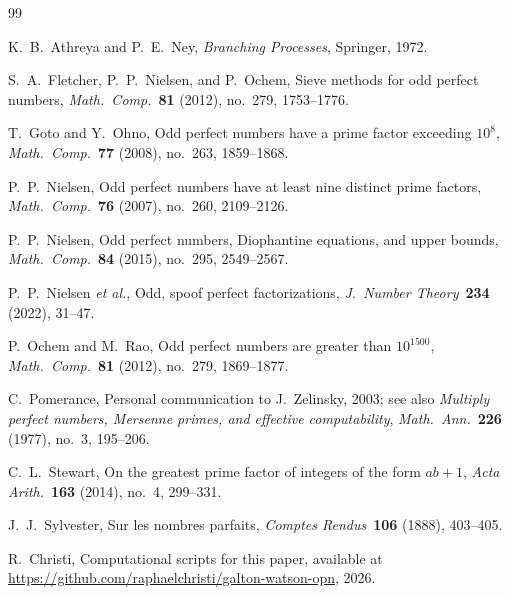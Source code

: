 \documentclass[11pt]{article}
\theoremstyle{definition}
\theoremstyle{remark}
\begin{document}
\begin{thebibliography}{99}

K.~B.~Athreya and P.~E.~Ney,
\emph{Branching Processes},
Springer, 1972.

S.~A.~Fletcher, P.~P.~Nielsen, and P.~Ochem,
Sieve methods for odd perfect numbers,
\emph{Math.\ Comp.}\ \textbf{81} (2012), no.~279, 1753--1776.

T.~Goto and Y.~Ohno,
Odd perfect numbers have a prime factor exceeding $10^8$,
\emph{Math.\ Comp.}\ \textbf{77} (2008), no.~263, 1859--1868.

P.~P.~Nielsen,
Odd perfect numbers have at least nine distinct prime factors,
\emph{Math.\ Comp.}\ \textbf{76} (2007), no.~260, 2109--2126.

P.~P.~Nielsen,
Odd perfect numbers, Diophantine equations, and upper bounds,
\emph{Math.\ Comp.}\ \textbf{84} (2015), no.~295, 2549--2567.

P.~P.~Nielsen \emph{et al.},
Odd, spoof perfect factorizations,
\emph{J.\ Number Theory}\ \textbf{234} (2022), 31--47.

P.~Ochem and M.~Rao,
Odd perfect numbers are greater than $10^{1500}$,
\emph{Math.\ Comp.}\ \textbf{81} (2012), no.~279, 1869--1877.

C.~Pomerance,
Personal communication to J.~Zelinsky, 2003;
see also \emph{Multiply perfect numbers, Mersenne primes, and effective computability},
\emph{Math.\ Ann.}\ \textbf{226} (1977), no.~3, 195--206.

C.~L.~Stewart,
On the greatest prime factor of integers of the form $ab + 1$,
\emph{Acta Arith.}\ \textbf{163} (2014), no.~4, 299--331.

J.~J.~Sylvester,
Sur les nombres parfaits,
\emph{Comptes Rendus}\ \textbf{106} (1888), 403--405.

R.~Christi,
Computational scripts for this paper,
available at \url{https://github.com/raphaelchristi/galton-watson-opn}, 2026.

\end{thebibliography}
\end{document}
